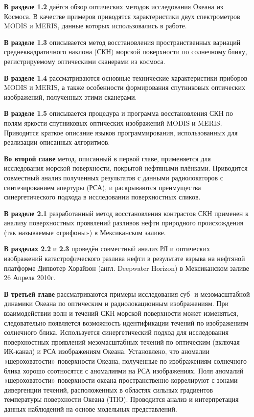 \textbf{В разделе 1.2} даётся обзор оптических методов исследования Океана из Космоса. В качестве примеров приводятся характеристики двух спектрометров MODIS и MERIS, данные которых использовались в работе. 

\textbf{В разделе 1.3} описывается метод восстановления пространственных вариаций среднеквадратичного наклона (СКН) морской поверхности по солнечному блику, регистрируемому оптическими сканерами из космоса.

\textbf{В разделе 1.4} рассматриваются основные технические характеристики приборов MODIS и MERIS, а также особенности формирования спутниковых оптических изображений, полученных этими сканерами.

\textbf{В разделе 1.5} описывается процедура и программа восстановления СКН по полям яркости спутниковых оптических изображений MODIS и MERIS. Приводится краткое описание языков программирования, использованных для реализации описанных алгоритмов.

\textbf{Во второй главе} метод, описанный в первой главе, применяется для исследования морской поверхности, покрытой нефтяными плёнками. Приводится совместный анализ полученных результатов с данными радиолокаторов с синтезированием апертуры (РСА), и раскрываются преимущества синергетического подхода в исследовании поверхностных сликов.

\textbf{В разделе 2.1} разработанный метод восстановления контрастов СКН применен к анализу поверхностных проявлений разливов нефти природного происхождения (так называемые «грифоны») в Мексиканском заливе.

\textbf{В разделах 2.2} и \textbf{2.3} проведён совместный анализ РЛ и оптических изображений катастрофического разлива нефти в результате взрыва на нефтяной платформе Дипвотер Хорайзон (англ. Deepwater Horizon) в Мексиканском заливе 26 Апреля 2010г.

\textbf{В третьей главе} рассматриваются примеры исследования суб- и мезомасштабной динамики Океана по оптическим и радиолокационным изображениям. При взаимодействии волн и течений СКН морской поверхности может изменяться, следовательно появляется возможность идентификации течений по изображениям солнечного блика. Используется синергетический подход для исследования поверхностных проявлений мезомасштабных течений  по оптическим (включая ИК-канал) и РСА изображениям Океана. Установлено, что аномалии «шероховатости» поверхности Океана, полученные по изображениям солнечного блика хорошо соотносятся с аномалиями на РСА изображениях. Поля аномалий «шероховатости» поверхности океана пространственно коррелируют с зонами дивергенции течений, расположенных в областях сильных градиентов температуры поверхности Океана (ТПО). Проводится анализ и интерпретация данных наблюдений на основе модельных представлений.


